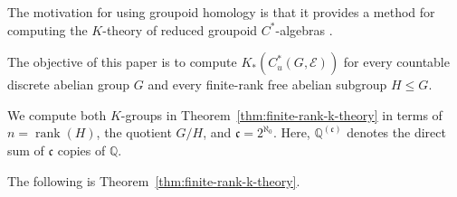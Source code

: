 \documentclass[pdflatex,sn-mathphys-num]{sn-jnl}%
\theoremstyle{plain}
\theoremstyle{remark}
\theoremstyle{definition}
\numberwithin{equation}{section}
\begin{document}
The motivation for using groupoid homology is that it provides a method for computing the \( K \)-theory of reduced groupoid \( C^* \)-algebras \cite{matui2016etale,farsi2018ample,yi2020homology,proietti2022homology,bonicke2023dynamic,proietti2023homology}.


The objective of this paper is to compute \( K_*(C_u^*(G,\mathcal E)) \) for every countable discrete abelian group \( G \) and every finite-rank free abelian subgroup \( H\leq G \).


%
%
%
%
%
%

We compute both \( K \)-groups in Theorem~\ref{thm:finite-rank-k-theory} in terms of \( n=\operatorname{rank}(H) \), the quotient \( G/H \), and \( \mathfrak c=2^{\aleph_0} \). Here, \( \mathbb Q^{(\mathfrak c)} \) denotes the direct sum of \( \mathfrak c \) copies of \( \mathbb Q \).

The following is Theorem~\ref{thm:finite-rank-k-theory}.
\end{document}
